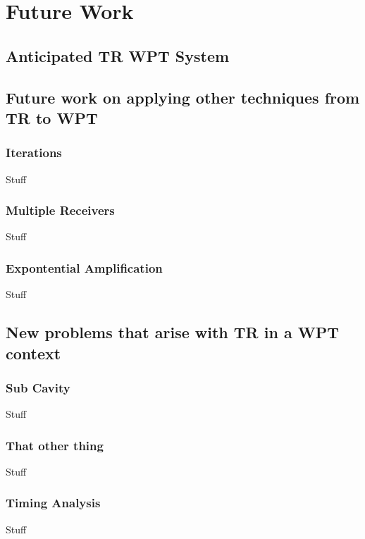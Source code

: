 \chapter{Future Work}
\label{ch:future}


\section{Anticipated TR WPT System}
\label{sec:future-roadmap}


\section{Future work on applying other techniques from TR to WPT}
\label{sec:future-tr}

\subsection{Iterations}

Stuff

\subsection{Multiple Receivers}

Stuff

\subsection{Expontential Amplification}

Stuff
\section{New problems that arise with TR in a WPT context}


\label{sec:future-wpt}

\subsection{Sub Cavity}

Stuff

\subsection{That other thing}

Stuff

\subsection{Timing Analysis}

Stuff
